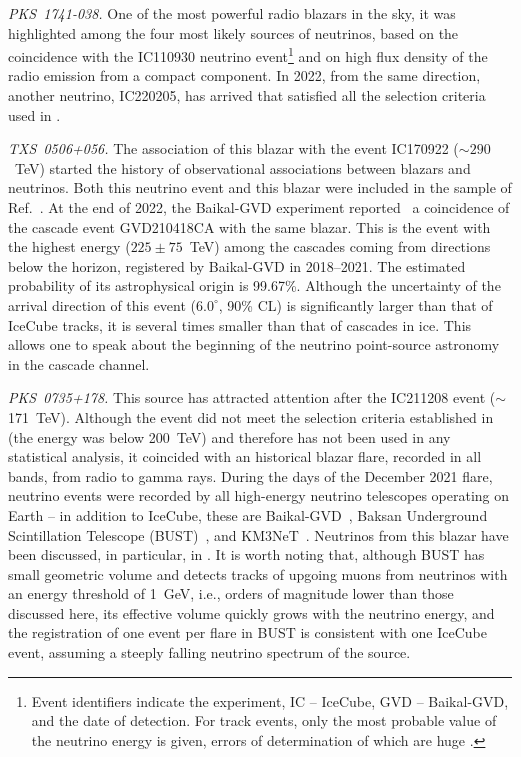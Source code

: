 \documentclass[a4paper,noshowpacs,noshowkeys,floatfix,twocolumn,preprintnumbers,nofootinbib]{revtex4-2}
\begin{document}
\textit{PKS~1741-038.}
One of the most powerful radio blazars in the sky, it was highlighted \cite{neutradio1} among the four most likely sources of neutrinos, based on the coincidence with the IC110930 neutrino event\footnote{Event identifiers indicate the experiment, IC -- IceCube, GVD -- Baikal-GVD, and the date of detection. For track events, only the most probable value of the neutrino energy is given, errors of determination of which are huge \cite{IceCube-TXS0506gamma,ST-UFN}.} and on high flux density of the radio emission from a compact component. In 2022, from the same direction, another neutrino, IC220205, has arrived that satisfied all the selection criteria used in \cite{neutradio1, neutradio2022}.

\textit{TXS~0506+056.}
The association of this blazar with the event IC170922 ($\sim 290$~TeV) started \cite{IceCube-TXS0506gamma} the history of observational associations between blazars and neutrinos. Both this neutrino event and this blazar were included in the sample of Ref.~\cite{neutradio1}. At the end of 2022, the Baikal-GVD experiment reported~\cite{Baikal-0506} a coincidence  of the cascade event GVD210418CA with the same blazar. This is the event with the highest energy ($225\pm 75$~TeV) among the cascades coming from directions below the horizon, registered by Baikal-GVD in 2018--2021. The estimated probability of its astrophysical origin is 99.67\%. Although the uncertainty of the arrival direction of this event ($6.0^{\circ}$, 90\% CL) is significantly larger than that of IceCube tracks, it is several times smaller than that of cascades in ice. This allows one to speak about the beginning of the neutrino point-source astronomy in the cascade channel.

\textit{PKS~0735+178.}
This source has attracted attention after the IC211208 event ($\sim$171~TeV). Although the event did not meet the selection criteria established in \cite{neutradio1} (the energy was below 200~TeV) and therefore has not been used in any statistical analysis, it coincided with an historical blazar flare, recorded in all bands, from radio to gamma rays. During the days of the December 2021 flare, neutrino events were recorded by all high-energy neutrino telescopes operating on Earth -- in addition to IceCube, these are Baikal-GVD~\cite{Baikal-ATel-0735, Baikal-paper-0735}, Baksan Underground Scintillation Telescope (BUST)~\cite{BUST-ATel-0735, BUST-paper-0735}, and KM3NeT~\cite{KM3Net-ATel-0735}. Neutrinos from this blazar have been discussed, in particular, in \cite{0735-int-1, 0735-int-4, 0735-VERITAS}. It is worth noting that, although BUST has small geometric volume and detects tracks of upgoing muons from neutrinos with an energy threshold of 1~GeV, i.e., orders of magnitude lower than those discussed here, its effective volume quickly grows with the neutrino energy, and the registration of one event per flare in BUST is consistent \cite{BUST-paper-0735} with one IceCube event, assuming a steeply falling neutrino spectrum of the source.
\end{document}
